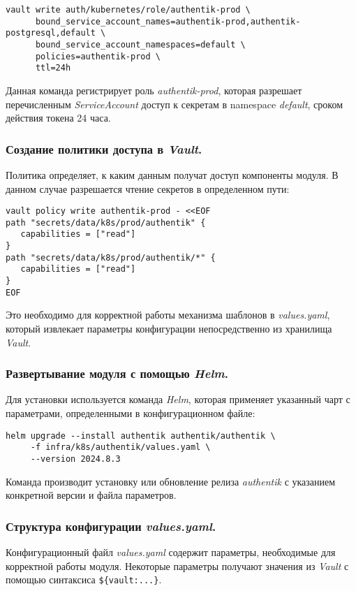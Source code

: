 \begin{lstlisting}
vault write auth/kubernetes/role/authentik-prod \
      bound_service_account_names=authentik-prod,authentik-postgresql,default \
      bound_service_account_namespaces=default \
      policies=authentik-prod \
      ttl=24h
\end{lstlisting}

Данная команда регистрирует роль \textit{authentik-prod}, которая разрешает перечисленным \textit{ServiceAccount} доступ к секретам в namespace \textit{default}, сроком действия токена 24 часа.

\subsubsection{Создание политики доступа в \textit{Vault}.} Политика определяет, к каким данным получат доступ компоненты модуля. В данном случае разрешается чтение секретов в определенном пути:

\begin{lstlisting}
vault policy write authentik-prod - <<EOF
path "secrets/data/k8s/prod/authentik" {
   capabilities = ["read"]
}
path "secrets/data/k8s/prod/authentik/*" {
   capabilities = ["read"]
}
EOF
\end{lstlisting}

Это необходимо для корректной работы механизма шаблонов в \textit{values.yaml}, который извлекает параметры конфигурации непосредственно из хранилища \textit{Vault}.

\subsubsection{Развертывание модуля с помощью \textit{Helm}.} Для установки используется команда \textit{Helm}, которая применяет указанный чарт с параметрами, определенными в конфигурационном файле:

\begin{lstlisting}
helm upgrade --install authentik authentik/authentik \
     -f infra/k8s/authentik/values.yaml \
     --version 2024.8.3
\end{lstlisting}

Команда производит установку или обновление релиза \textit{authentik} с указанием конкретной версии и файла параметров.

\subsubsection{Структура конфигурации \textit{values.yaml}.} Конфигурационный файл \textit{values.yaml} содержит параметры, необходимые для корректной работы модуля. Некоторые параметры получают значения из \textit{Vault} с помощью синтаксиса \lstinline|${vault:...}|.

